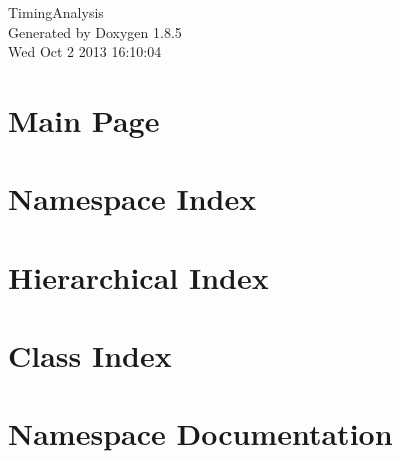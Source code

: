 \documentclass[twoside]{book}
\newcommand{\clearemptydoublepage}{%
  \newpage{\pagestyle{empty}\cleardoublepage}%
}
\begin{document}
\hypersetup{pageanchor=false}
\begin{titlepage}
\vspace*{7cm}
\begin{center}%
{\Large Timing\-Analysis }\\
\vspace*{1cm}
{\large Generated by Doxygen 1.8.5}\\
\vspace*{0.5cm}
{\small Wed Oct 2 2013 16:10:04}\\
\end{center}
\end{titlepage}
\clearemptydoublepage
\tableofcontents
\clearemptydoublepage
{}
\hypersetup{pageanchor=true}

\chapter{Main Page}
\label{index}\hypertarget{index}{}
\chapter{Namespace Index}

\chapter{Hierarchical Index}

\chapter{Class Index}

\chapter{Namespace Documentation}

\end{document}
